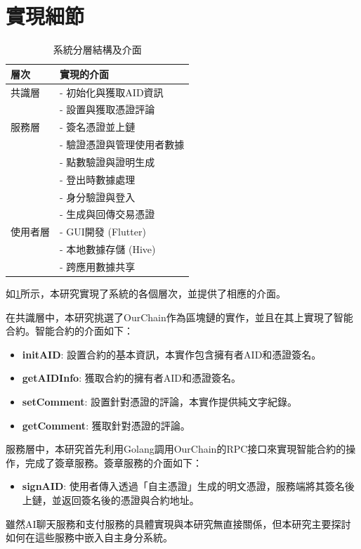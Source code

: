\section{實現細節}
\begin{table}[htbp]
  \centering
  \caption{系統分層結構及介面}
  \label{tab:system-interfaces}
  \begin{tabularx}{\textwidth}{|l|X|}
    \hline
    \textbf{層次} & \textbf{實現的介面}    \\
    \hline
    共識層         & - 初始化與獲取AID資訊     \\
                & - 設置與獲取憑證評論       \\
    \hline
    服務層         & - 簽名憑證並上鏈         \\
                & - 驗證憑證與管理使用者數據    \\
                & - 點數驗證與證明生成       \\
                & - 登出時數據處理         \\
                & - 身分驗證與登入         \\
                & - 生成與回傳交易憑證       \\
    \hline
    使用者層        & - GUI開發 (Flutter) \\
                & - 本地數據存儲 (Hive)   \\
                & - 跨應用數據共享         \\
    \hline
  \end{tabularx}
\end{table}
如\ref{tab:system-interfaces}所示，本研究實現了系統的各個層次，並提供了相應的介面。

在共識層中，本研究挑選了OurChain\cite{ourlab408_ourchain}作為區塊鏈的實作，並且在其上實現了智能合約。智能合約的介面如下：
\begin{itemize}
  \item \textbf{initAID}: 設置合約的基本資訊，本實作包含擁有者AID和憑證簽名。
  \item \textbf{getAIDInfo}: 獲取合約的擁有者AID和憑證簽名。
  \item \textbf{setComment}: 設置針對憑證的評論，本實作提供純文字紀錄。
  \item \textbf{getComment}: 獲取針對憑證的評論。
\end{itemize}
服務層中，本研究首先利用Golang調用OurChain的RPC接口來實現智能合約的操作，完成了簽章服務。簽章服務的介面如下：
\begin{itemize}
  \item \textbf{signAID}: 使用者傳入透過「自主憑證」生成的明文憑證，服務端將其簽名後上鏈，並返回簽名後的憑證與合約地址。
\end{itemize}
雖然AI聊天服務和支付服務的具體實現與本研究無直接關係，但本研究主要探討如何在這些服務中嵌入自主身分系統。

